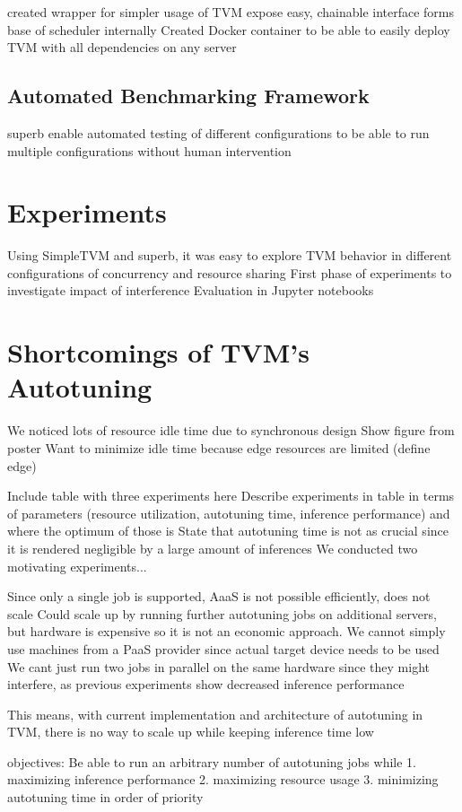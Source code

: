 created wrapper for simpler usage of TVM
expose easy, chainable interface
forms base of scheduler internally
Created Docker container to be able to easily deploy TVM with all dependencies on any server

\subsection{Automated Benchmarking Framework}
superb
enable automated testing of different configurations to be able to run multiple configurations without human intervention

\section{Experiments}
Using SimpleTVM and superb, it was easy to explore TVM behavior in different configurations of concurrency and resource sharing
First phase of experiments to investigate impact of interference
Evaluation in Jupyter notebooks

\section{Shortcomings of TVM's Autotuning}
We noticed lots of resource idle time due to synchronous design
Show figure from poster
Want to minimize idle time because edge resources are limited (define edge)

Include table with three experiments here
Describe experiments in table in terms of parameters (resource utilization, autotuning time, inference performance) and where the optimum of those is
State that autotuning time is not as crucial since it is rendered negligible by a large amount of inferences
We conducted two motivating experiments...

Since only a single job is supported, AaaS is not possible efficiently, does not scale
Could scale up by running further autotuning jobs on additional servers, but hardware is expensive so it is not an economic approach. We cannot simply use machines from a PaaS provider since actual target device needs to be used
We cant just run two jobs in parallel on the same hardware since they might interfere, as previous experiments show decreased inference performance

This means, with current implementation and architecture of autotuning in TVM, there is no way to scale up while keeping inference time low

objectives:
Be able to run an arbitrary number of autotuning jobs while
1. maximizing inference performance
2. maximizing resource usage
3. minimizing autotuning time
in order of priority